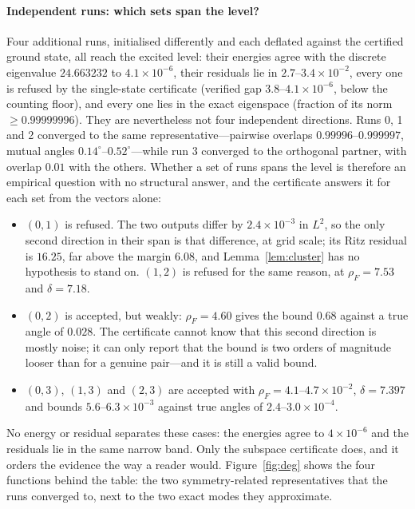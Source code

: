 \paragraph{Independent runs: which sets span the level?}
Four additional runs, initialised differently and each deflated against the
certified ground state, all reach the excited level: their energies agree with
the discrete eigenvalue $24.663232$ to $4.1\times10^{-6}$, their residuals lie
in $2.7$--$3.4\times10^{-2}$, every one is refused by the single-state
certificate (verified gap $3.8$--$4.1\times10^{-6}$, below the counting floor),
and every one lies in the exact eigenspace (fraction of its norm
$\ge0.99999996$). They are nevertheless not four independent directions. Runs
0, 1 and 2 converged to the same representative---pairwise overlaps
$0.99996$--$0.999997$, mutual angles $0.14^\circ$--$0.52^\circ$---while run 3
converged to the orthogonal partner, with overlap $0.01$ with the others.
Whether a set of runs spans the level is therefore an empirical question with
no structural answer, and the certificate answers it for each set from the
vectors alone:
\begin{itemize}
\item $(0,1)$ is refused. The two outputs differ by $2.4\times10^{-3}$ in
  $L^2$, so the only second direction in their span is that difference, at
  grid scale; its Ritz residual is $16.25$, far above the margin $6.08$, and
  Lemma~\ref{lem:cluster} has no hypothesis to stand on. $(1,2)$ is refused
  for the same reason, at $\rho_F=7.53$ and $\delta=7.18$.
\item $(0,2)$ is accepted, but weakly: $\rho_F=4.60$ gives the bound $0.68$
  against a true angle of $0.028$. The certificate cannot know that this
  second direction is mostly noise; it can only report that the bound is two orders of
  magnitude looser than for a genuine pair---and it is still a valid bound.
\item $(0,3)$, $(1,3)$ and $(2,3)$ are accepted with
  $\rho_F=4.1$--$4.7\times10^{-2}$, $\delta=7.397$ and bounds
  $5.6$--$6.3\times10^{-3}$ against true angles of
  $2.4$--$3.0\times10^{-4}$.
\end{itemize}
No energy or residual separates these cases: the energies agree to
$4\times10^{-6}$ and the residuals lie in the same narrow band. Only the
subspace certificate does, and it orders the evidence the way a reader would.
Figure~\ref{fig:deg} shows the four functions behind the table: the two
symmetry-related representatives that the runs converged to, next to the two
exact modes they approximate.

